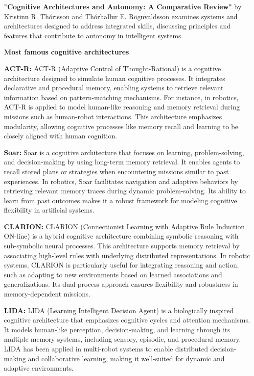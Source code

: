 \documentclass{book}
\providecommand{\ProjectDeepHeading}[2]{%
    \par\medskip\noindent\textbf{#2}\par\smallskip
}
\begin{document}
            \textbf{"Cognitive Architectures and Autonomy: A Comparative Review"} by Kristinn R. Thórisson and Thórhallur E. Rögnvaldsson examines systems and architectures designed to address integrated skills, discussing principles and features that contribute to autonomy in intelligent systems. 



        \ProjectDeepHeading{1}{Most famous cognitive architectures}
            \textbf{ACT-R:} ACT-R (Adaptive Control of Thought-Rational) is a cognitive architecture designed to simulate human cognitive processes. It integrates declarative and procedural memory, enabling systems to retrieve relevant information based on pattern-matching mechanisms. For instance, in robotics, ACT-R is applied to model human-like reasoning and memory retrieval during missions such as human-robot interactions. This architecture emphasizes modularity, allowing cognitive processes like memory recall and learning to be closely aligned with human cognition.

            \textbf{Soar:} Soar is a cognitive architecture that focuses on learning, problem-solving, and decision-making by using long-term memory retrieval. It enables agents to recall stored plans or strategies when encountering missions similar to past experiences. In robotics, Soar facilitates navigation and adaptive behaviors by retrieving relevant memory traces during dynamic problem-solving. Its ability to learn from past outcomes makes it a robust framework for modeling cognitive flexibility in artificial systems.

            \textbf{CLARION:} CLARION (Connectionist Learning with Adaptive Rule Induction ON-line) is a hybrid cognitive architecture combining symbolic reasoning with sub-symbolic neural processes. This architecture supports memory retrieval by associating high-level rules with underlying distributed representations. In robotic systems, CLARION is particularly useful for integrating reasoning and action, such as adapting to new environments based on learned associations and generalizations. Its dual-process approach ensures flexibility and robustness in memory-dependent missions.

            \textbf{LIDA:} LIDA (Learning Intelligent Decision Agent) is a biologically inspired cognitive architecture that emphasizes cognitive cycles and attention mechanisms. It models human-like perception, decision-making, and learning through its multiple memory systems, including sensory, episodic, and procedural memory. LIDA has been applied in multi-robot systems to enable distributed decision-making and collaborative learning, making it well-suited for dynamic and adaptive environments. 
\end{document}
